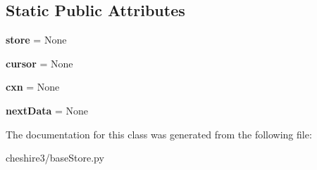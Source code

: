 \subsection*{Static Public Attributes}
\begin{DoxyCompactItemize}
\item 
\hypertarget{classcheshire3_1_1base_store_1_1_bdb_iter_a6c8b2d488ccee72924f189cacf21bc8e}{{\bfseries store} = None}\label{classcheshire3_1_1base_store_1_1_bdb_iter_a6c8b2d488ccee72924f189cacf21bc8e}

\item 
\hypertarget{classcheshire3_1_1base_store_1_1_bdb_iter_af6b06d0b8deddc1151ae2d047dcb9834}{{\bfseries cursor} = None}\label{classcheshire3_1_1base_store_1_1_bdb_iter_af6b06d0b8deddc1151ae2d047dcb9834}

\item 
\hypertarget{classcheshire3_1_1base_store_1_1_bdb_iter_aa6725efab28827a24bdeab1c25f9cd7e}{{\bfseries cxn} = None}\label{classcheshire3_1_1base_store_1_1_bdb_iter_aa6725efab28827a24bdeab1c25f9cd7e}

\item 
\hypertarget{classcheshire3_1_1base_store_1_1_bdb_iter_a6ad72010192f4c208708e2a28faf926d}{{\bfseries next\-Data} = None}\label{classcheshire3_1_1base_store_1_1_bdb_iter_a6ad72010192f4c208708e2a28faf926d}

\end{DoxyCompactItemize}


The documentation for this class was generated from the following file\-:\begin{DoxyCompactItemize}
\item 
cheshire3/base\-Store.\-py\end{DoxyCompactItemize}
